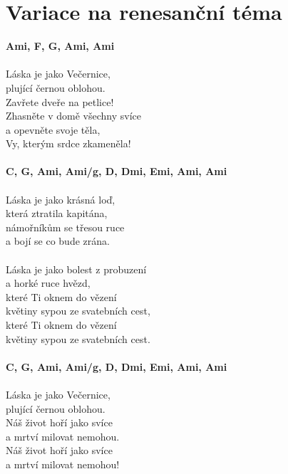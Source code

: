 \section{Variace na renesanční téma}
\footnotesize\textbf{Ami, F, G, Ami, Ami\6}\\
\normalsize
\\
Láska je jako Večernice,\\
plující černou oblohou.\\
Zavřete dveře na petlice!\\
Zhasněte v domě všechny svíce\\
a opevněte svoje těla,\\
Vy, kterým srdce zkameněla!\\
\\
\footnotesize\textbf{C, G, Ami, Ami/g, D, Dmi, Emi\7, Ami, Ami\6}\\
\normalsize
\\
Láska je jako krásná loď,\\
která ztratila kapitána,\\
námořníkům se třesou ruce\\
a bojí se co bude zrána.\\
\\
Láska je jako bolest z probuzení\\
a horké ruce hvězd,\\
které Ti oknem do vězení\\
květiny sypou ze svatebních cest,\\
které Ti oknem do vězení\\
květiny sypou ze svatebních cest.\\
\\
\footnotesize\textbf{C, G, Ami, Ami/g, D, Dmi, Emi\7, Ami, Ami\6}\\
\normalsize
\\
Láska je jako Večernice,\\
plující černou oblohou.\\
Náš život hoří jako svíce\\
a mrtví milovat nemohou.\\
Náš život hoří jako svíce\\
a mrtví milovat nemohou!\\